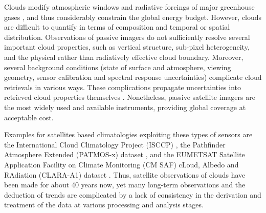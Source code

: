 Clouds modify atmospheric windows and radiative forcings of major greenhouse
gases \citep{Kiehl97}, and thus considerably constrain the global energy
budget. However, clouds are difficult to quantify in terms of composition and
temporal or spatial distribution. Observations of passive imagers do not
sufficiently resolve several important cloud properties, such as
vertical structure, sub-pixel heterogeneity, and the physical rather than radiatively
effective cloud boundary. Moreover, several background conditions (state of
surface and atmosphere, viewing geometry, sensor calibration and spectral
response uncertainties) complicate cloud retrievals in various ways. These
complications propagate uncertainties into retrieved cloud properties
themselves \citep{Hamann14}. Nonetheless, passive satellite imagers are the
most widely used and available instruments, providing global coverage at
acceptable cost. 

Examples for satellites based climatologies exploiting these types of sensors are the
International Cloud Climatology Project (ISCCP) \citep{Rossow99}, the
Pathfinder Atmosphere Extended (PATMOS-x) dataset
\citep{Heidinger09,Heidinger12}, and the EUMETSAT Satellite Application
Facility on Climate Monitoring (CM SAF) cLoud, Albedo and RAdiation (CLARA-A1)
dataset \citep{Karlsson13}.
Thus, satellite observations of clouds have
been made for about 40 years now, yet many long-term observations and the
deduction of trends are complicated by a lack of consistency in the derivation
and treatment of the data at various processing and analysis stages.

